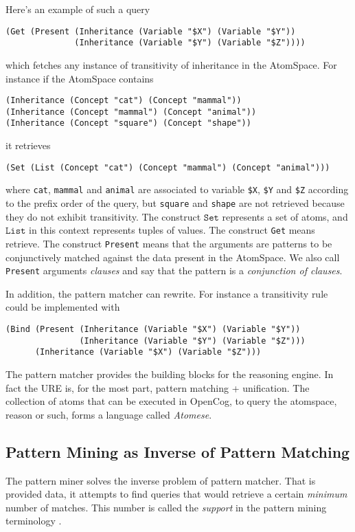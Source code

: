 \documentclass[runningheads]{llncs}
\begin{document}
Here's an example of such a query
\begin{verbatim}
(Get (Present (Inheritance (Variable "$X") (Variable "$Y"))
              (Inheritance (Variable "$Y") (Variable "$Z"))))
\end{verbatim}
which fetches any instance of transitivity of inheritance in the
AtomSpace. For instance if the AtomSpace contains
\begin{verbatim}
(Inheritance (Concept "cat") (Concept "mammal"))
(Inheritance (Concept "mammal") (Concept "animal"))
(Inheritance (Concept "square") (Concept "shape"))
\end{verbatim}
it retrieves
\begin{verbatim}
(Set (List (Concept "cat") (Concept "mammal") (Concept "animal")))
\end{verbatim}
where \texttt{cat}, \texttt{mammal} and \texttt{animal} are associated
to variable \texttt{\$X}, \texttt{\$Y} and \texttt{\$Z} according to
the prefix order of the query, but \texttt{square} and \texttt{shape}
are not retrieved because they do not exhibit transitivity. The
construct $\texttt{Set}$ represents a set of atoms, and
$\texttt{List}$ in this context represents tuples of values. The
construct \texttt{Get} means retrieve. The construct \texttt{Present}
means that the arguments are patterns to be conjunctively matched
against the data present in the AtomSpace. We also call
\texttt{Present} arguments \emph{clauses} and say that the pattern is
a \emph{conjunction of clauses}.

In addition, the pattern matcher can rewrite. For instance a
transitivity rule could be implemented with
\begin{verbatim}
(Bind (Present (Inheritance (Variable "$X") (Variable "$Y"))
               (Inheritance (Variable "$Y") (Variable "$Z")))
      (Inheritance (Variable "$X") (Variable "$Z")))
\end{verbatim}
The pattern matcher provides the building blocks for the reasoning
engine. In fact the URE is, for the most part, pattern matching +
unification. The collection of atoms that can be executed in OpenCog,
to query the atomspace, reason or such, forms a language called
\emph{Atomese}.

\subsection{Pattern Mining as Inverse of Pattern Matching}

The pattern miner solves the inverse problem of pattern matcher. That
is provided data, it attempts to find queries that would retrieve a
certain \emph{minimum} number of matches. This number is called the
\emph{support} in the pattern mining terminology \cite{Chi2005Freq,
  Agrawal1994fastalgorithms}.
\end{document}
